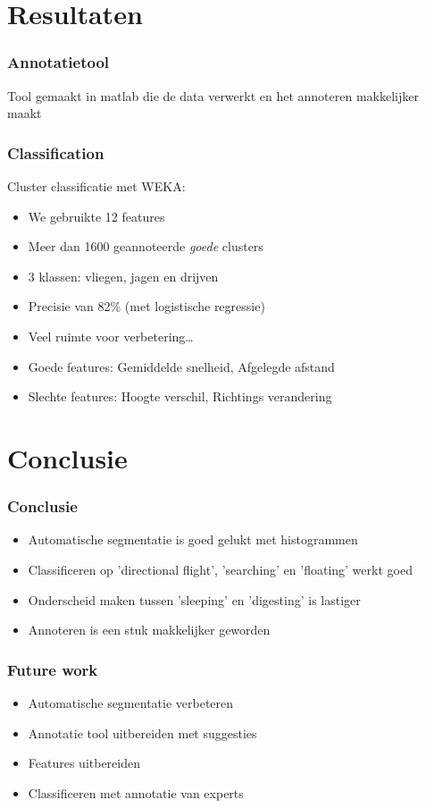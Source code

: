 \documentclass{beamer}
\newcommand{\slide}[2]
{
\begin{frame}
\frametitle{#1} 

#2

\end{frame}
}
\begin{document}
\section{Resultaten}
\slide{Annotatietool}
{
	Tool gemaakt in matlab die de data verwerkt en het annoteren makkelijker maakt
}

\slide{Classification}
{
Cluster classificatie met WEKA:
\begin{itemize}
    \item We gebruikte 12 features
    \item Meer dan 1600 geannoteerde \emph{goede} clusters
    \item 3 klassen: vliegen, jagen en drijven
    \item Precisie van 82\% (met logistische regressie)
    \item Veel ruimte voor verbetering\ldots
\end{itemize}
\vspace{1cm}
\begin{itemize}
\item Goede features: Gemiddelde snelheid, Afgelegde afstand
\item Slechte features: Hoogte verschil, Richtings verandering
\end{itemize}
}

\section{Conclusie}

\slide{Conclusie}
{
\begin{itemize}
	\item Automatische segmentatie is goed gelukt met histogrammen
	\item Classificeren op 'directional flight', 'searching' en 'floating' werkt goed
	\item Onderscheid maken tussen 'sleeping' en 'digesting' is lastiger
	\item Annoteren is een stuk makkelijker geworden
\end{itemize} 
}

\slide{Future work}
{
\begin{itemize}
	\item Automatische segmentatie verbeteren
	\item Annotatie tool uitbereiden met suggesties
	\item Features uitbereiden
	\item Classificeren met annotatie van experts
\end{itemize} 
}
\end{document}
